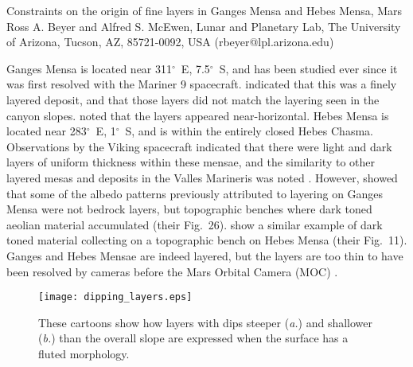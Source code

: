 \documentclass{lpscabs}
\begin{document}

\begin{\titlearea}{Constraints on the origin of fine layers in {Ganges Mensa} and {Hebes Mensa}, {Mars}}
Ross A. Beyer and Alfred S. McEwen, Lunar and Planetary Lab, The University of Arizona, Tucson, AZ, 85721-0092, USA (rbeyer@lpl.arizona.edu)
\end{\titlearea}

\begin{abstracttext}


Ganges Mensa is located near 311$^{\circ}$~E, 7.5$^{\circ}$~S, and
has been studied ever since it was first resolved with the Mariner
9 spacecraft.  \citet{1973JGR....78.4009m} indicated that this was
a finely layered deposit, and that those layers did not match the
layering seen in the canyon slopes.  \citet{1973JGR....78.4063s}
noted that the layers appeared near-horizontal.  Hebes Mensa is
located near 283$^{\circ}$~E, 1$^{\circ}$~S, and is within the
entirely closed Hebes Chasma.  Observations by the Viking spacecraft
indicated that there were light and dark layers of uniform thickness
within these mensae, and the similarity
to other layered mesas and deposits in the Valles Marineris was
noted \citep{1993JGR....9811105K}.  However, \citet{2001JGR...10623429M}
showed that some of the albedo patterns previously attributed to
layering on Ganges Mensa were not bedrock layers, but topographic
benches where dark toned aeolian material accumulated (their Fig.~26).
\citet{2004PSS...52..167K} show a similar example of dark toned
material collecting on a topographic bench on Hebes Mensa (their
Fig.~11).  Ganges and Hebes Mensae are indeed layered, but the
layers are too thin to have been resolved by cameras before the Mars
Orbital Camera (MOC) \citep{2001JGR...10623429M}.
\begin{figure}[!h]
\noindent\texttt{[image: dipping\_layers.eps]}
\caption{
        \label{dipping_layers}
		These cartoons show how layers with dips steeper (\emph{a.})
		and shallower (\emph{b.}) than the overall slope are expressed 
		when the surface has a fluted morphology.
        }
\end{figure}


\end{abstracttext}
\end{document}
